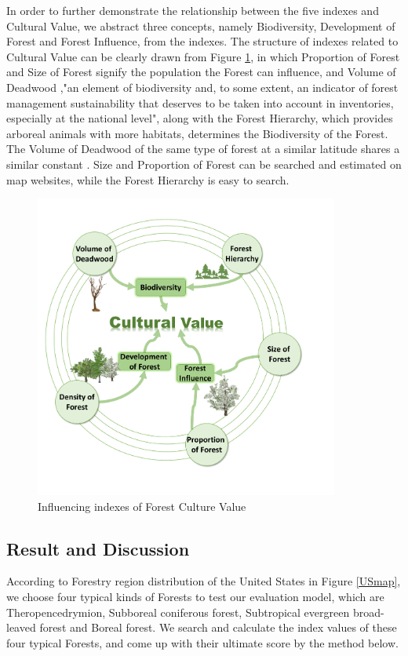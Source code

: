 \documentclass{mcmthesis}
\numberwithin{figure}{section}
\numberwithin{table}{section}
\numberwithin{equation}{section}
\begin{document}
\par
In order to further demonstrate the relationship between the five indexes and 
Cultural Value, we abstract three concepts, namely Biodiversity, Development of 
Forest and Forest Influence, from the indexes. The structure of indexes related to 
Cultural Value can be clearly drawn from Figure \ref{Index_CulVal}, 
in which Proportion of Forest and Size
of Forest signify the population the Forest can influence, and Volume of Deadwood
,"an element of biodiversity and, to some extent, an indicator of forest 
management sustainability that deserves to be taken into account in inventories,
especially at the national level"\citep{rondeux2010review}, along with the 
Forest Hierarchy, which provides arboreal 
animals with more habitats, determines the Biodiversity of the Forest.
The Volume of Deadwood of the same type of forest at a similar latitude shares a similar 
constant \citep{2007US}. Size and Proportion of Forest can be searched and estimated on 
map websites, while the Forest Hierarchy is easy to search. 
\begin{figure}[htbp]
  \centering
  \includegraphics[width = 10cm]{code&pic/Model2.pdf}
  \caption{Influencing indexes of Forest Culture Value}\label{Index_CulVal}
\end{figure}

\subsection{Result and Discussion}

According to Forestry region distribution of the United States in Figure \ref{USmap}, 
we choose four typical kinds of Forests to test our evaluation model, which are
Theropencedrymion, Subboreal coniferous forest, Subtropical 
evergreen broad-leaved forest and Boreal forest. We search and calculate the index values
of these four typical Forests, and come up with their ultimate score by the method below.
\end{document}
